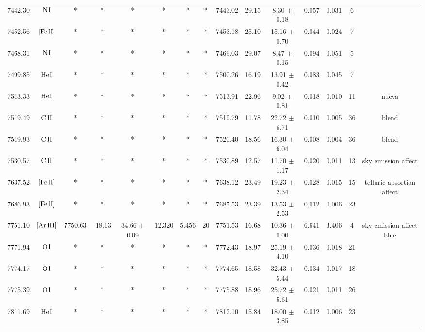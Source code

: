 \documentclass{article}
\begin{document}
\begin{table*}
\begin{adjustbox}{width=\textwidth}
\begin{tabular}{ccccccccccccccc}
7442.30 & $\mbox{N}\thinspace \mbox{I}$ & * & * & * & * & * & * & 7443.02 & 29.15 & 8.30 $\pm$ 0.18 & 0.057 & 0.031 & 6 &  \\
7452.56 & $\mbox{[Fe}\thinspace \mbox{II]}$ & * & * & * & * & * & * & 7453.18 & 25.10 & 15.16 $\pm$ 0.70 & 0.044 & 0.024 & 7 &  \\
7468.31 & $\mbox{N}\thinspace \mbox{I}$ & * & * & * & * & * & * & 7469.03 & 29.07 & 8.47 $\pm$ 0.15 & 0.094 & 0.051 & 5 &  \\
7499.85 & $\mbox{He}\thinspace \mbox{I}$ & * & * & * & * & * & * & 7500.26 & 16.19 & 13.91 $\pm$ 0.42 & 0.083 & 0.045 & 7 &  \\
7513.33 & $\mbox{He}\thinspace \mbox{I}$ & * & * & * & * & * & * & 7513.91 & 22.96 & 9.02 $\pm$ 0.81 & 0.018 & 0.010 & 11 &  nueva \\
7519.49 & $\mbox{C}\thinspace \mbox{II}$ & * & * & * & * & * & * & 7519.79 & 11.78 & 22.72 $\pm$ 6.71 & 0.010 & 0.005 & 36 &  blend \\
7519.93 & $\mbox{C}\thinspace \mbox{II}$ & * & * & * & * & * & * & 7520.40 & 18.56 & 16.30 $\pm$ 6.04 & 0.008 & 0.004 & 36 &  blend \\
7530.57 & $\mbox{C}\thinspace \mbox{II}$ & * & * & * & * & * & * & 7530.89 & 12.57 & 11.70 $\pm$ 1.17 & 0.020 & 0.011 & 13 &  sky emission affect \\
7637.52 & $\mbox{[Fe}\thinspace \mbox{II]}$ & * & * & * & * & * & * & 7638.12 & 23.49 & 19.23 $\pm$ 2.34 & 0.028 & 0.015 & 15 &  telluric absortion affect \\
7686.93 & $\mbox{[Fe}\thinspace \mbox{II]}$ & * & * & * & * & * & * & 7687.53 & 23.39 & 13.53 $\pm$ 2.53 & 0.012 & 0.006 & 23 &  \\
7751.10 & $\mbox{[Ar}\thinspace \mbox{III]}$ & 7750.63 & -18.13 & 34.66 $\pm$ 0.09 & 12.320 & 5.456 & 20 & 7751.53 & 16.68 & 10.36 $\pm$ 0.00 & 6.641 & 3.406 & 4 &  sky emission affect blue \\
7771.94 & $\mbox{O}\thinspace \mbox{I}$ & * & * & * & * & * & * & 7772.43 & 18.97 & 25.19 $\pm$ 4.10 & 0.036 & 0.018 & 21 &   \\
7774.17 & $\mbox{O}\thinspace \mbox{I}$ & * & * & * & * & * & * & 7774.65 & 18.58 & 32.43 $\pm$ 5.44 & 0.034 & 0.017 & 18 &   \\
7775.39 & $\mbox{O}\thinspace \mbox{I}$ & * & * & * & * & * & * & 7775.88 & 18.96 & 25.72 $\pm$ 5.61 & 0.021 & 0.011 & 26 &   \\
7811.69 & $\mbox{He}\thinspace \mbox{I}$ & * & * & * & * & * & * & 7812.10 & 15.84 & 18.00 $\pm$ 3.85 & 0.012 & 0.006 & 23 &  \\

\end{tabular}
\end{adjustbox}
\end{table*}
\end{document}
